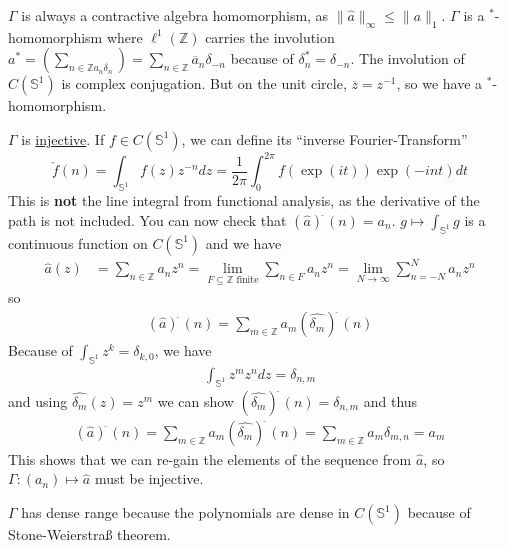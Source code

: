 \documentclass[a4paper]{article}
\newcommand{\unitcircle}{\mathds{S}^1}
\begin{document}
\begin{example}
\begin{enumerate}
		      $\Gamma$ is always a contractive algebra homomorphism, as $\|\hat{a}\|_\infty \leq \|a\|_1$.
		      $\Gamma$ is a $^*$-homomorphism where $\ell^1(\mathds{Z})$ carries the involution $a^* = \left(\sum_{n \in \mathds{Z} a_n \delta_n}\right) = \sum_{n \in \mathds{Z}} \overline{a}_n \delta_{-n}$ because of $\delta_n^* = \delta_{-n}$.
		      The involution of $C(\unitcircle)$ is complex conjugation. But on the unit circle, $\overline{z} = z^{-1}$, so we have a $^*$-homomorphism.

		      $\Gamma$ is \underline{injective}. If $f \in C(\mathds{S}^1)$, we can define its \enquote{inverse Fourier-Transform}
		      \begin{equation*}
			      \check{f}(n) = \int_{\mathds{S}^1} f(z) z^{-n} dz = \frac{1}{2 \pi} \int_0^{2 \pi} f(\exp(it)) \exp(-int) dt
		      \end{equation*}
		      This is \textbf{not} the line integral from functional analysis, as the derivative of the path is not included.
		      You can now check that $(\hat{a})^{\check{~}}(n) = a_n$.
		      $g \mapsto \int_{\mathds{S}^1} g$ is a continuous function on $C(\unitcircle)$ and we have
		      \begin{align*}
			      \hat{a}(z) & = \sum_{n \in \mathds{Z}} a_n z^n = \lim_{F \subseteq \mathds{Z} \text{ finite}} \sum_{n \in F} a_n z^n
			      = \lim_{N \to \infty} \sum_{n = -N}^N a_n z^n
		      \end{align*}
		      so
		      \begin{align*}
			      (\hat{a})^{\check{~}} (n) = \sum_{m \in \mathds{Z}} a_m (\hat{\delta_m})^{\check{~}} (n)
		      \end{align*}
		      Because of $\int_{\unitcircle} z^k = \delta_{k, 0}$, we have
		      \begin{align*}
			      \int_{\unitcircle} z^m z^n dz = \delta_{n,m}
		      \end{align*}
		      and using $\hat{\delta_m}(z) = z^m$ we can show $(\hat{\delta_m})^{\check{~}} (n) = \delta_{n,m}$ and thus
		      \begin{align*}
			      (\hat{a})^{\check{~}} (n) = \sum_{m \in \mathds{Z}} a_m (\hat{\delta_m})^{\check{~}} (n) = \sum_{m \in \mathds{Z}} a_m \delta_{m,n} = a_m
		      \end{align*}
		      This shows that we can re-gain the elements of the sequence from $\hat{a}$, so $\Gamma: (a_n) \mapsto \hat{a}$ must be injective.

		      $\Gamma$ has dense range because the polynomials are dense in $C(\unitcircle)$ because of Stone-Weierstraß theorem.


\end{enumerate}
\end{example}
\end{document}
